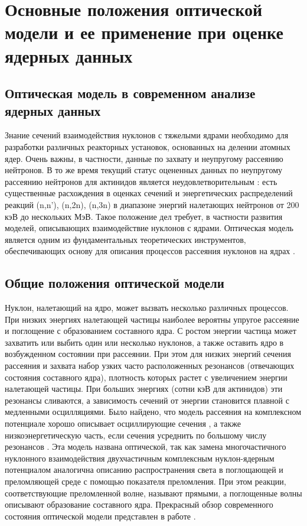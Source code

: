 \chapter{Основные положения оптической модели и ее применение при оценке ядерных данных}

\section{Оптическая модель в современном анализе ядерных данных}

Знание сечений взаимодействия нуклонов с тяжелыми ядрами необходимо для разработки различных реакторных установок, основанных на делении атомных ядер. Очень важны, в частности, данные по захвату и неупругому рассеянию нейтронов. В то же время текущий статус оцененных данных по неупругому рассеянию нейтронов для актинидов является неудовлетворительным \cite{INDCReport2012}: есть существенные расхождения в оценках сечений и энергетических распределений реакций (n,n’), (n,2n), (n,3n) в диапазоне энергий налетающих нейтронов от 200 кэВ до нескольких МэВ. Такое положение дел требует, в частности развития моделей, описывающих взаимодействие нуклонов с ядрами. Оптическая модель является одним из фундаментальных теоретических инструментов, обеспечивающих основу для описания процессов рассеяния нуклонов на ядрах \cite{HodgsonBookRus}.

\section{Общие положения оптической модели}

Нуклон, налетающий на ядро, может вызвать несколько различных процессов. При низких энергиях налетающей частицы наиболее вероятны упругое рассеяние и поглощение с образованием составного ядра. С ростом энергии частица может захватить или выбить один или несколько нуклонов, а также оставить ядро в возбужденном состоянии при рассеянии. При этом для низких энергий сечения рассеяния и захвата набор узких часто расположенных резонансов (отвечающих состояния составного ядра), плотность которых растет с увеличением энергии налетающей частицы. При больших энергиях (сотни кэВ для актинидов) эти резонансы сливаются, а зависимость сечений от энергии становится плавной с медленными осцилляциями. 
Было найдено, что модель рассеяния на комплексном потенциале хорошо описывает осциллирующие сечения \cite{Fernbach1949, Serber1947}, а также низкоэнергетическую часть, если сечения усреднить по большому числу резонансов \cite{Feshbach1954}. Эта модель названа оптической, так как замена многочастичного нуклонного взаимодействия двухчастичным комплексным нуклон-ядерным потенциалом аналогична описанию распространения света в поглощающей и преломляющей среде с помощью показателя преломления. При этом реакции, соответствующие преломленной волне, называют прямыми, а поглощенные волны описывают образование составного ядра. Прекрасный обзор современного состояния оптической модели представлен в работе \cite{Dickhoff2019}.

